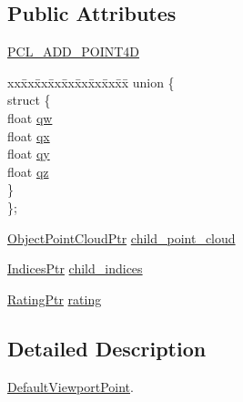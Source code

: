 \subsection*{\-Public \-Attributes}
\begin{DoxyCompactItemize}
\item 
\hyperlink{structnext__best__view_1_1DefaultViewportPoint_a04945c245ebdd7ef5a9f6aa2320d2bcb}{\-P\-C\-L\-\_\-\-A\-D\-D\-\_\-\-P\-O\-I\-N\-T4\-D}
\item 
\begin{tabbing}
xx\=xx\=xx\=xx\=xx\=xx\=xx\=xx\=xx\=\kill
union \{\\
\>struct \{\\
\>\>float \hyperlink{structnext__best__view_1_1DefaultViewportPoint_af7bf215f49b2d0cf2bbbeb95ddc6b101}{qw}\\
\>\>float \hyperlink{structnext__best__view_1_1DefaultViewportPoint_a9c2d21a9ea378fafa7c75a254b52999d}{qx}\\
\>\>float \hyperlink{structnext__best__view_1_1DefaultViewportPoint_aa68cbfe3d11d77f1beb7f43cf22b86eb}{qy}\\
\>\>float \hyperlink{structnext__best__view_1_1DefaultViewportPoint_ae5cdbdef5b635e1042b32d0bf9eb6a95}{qz}\\
\>\} \\
\}; \\

\end{tabbing}\item 
\hyperlink{namespacenext__best__view_af8b3b448f67ab117bb7c59bc7c34f0b3}{\-Object\-Point\-Cloud\-Ptr} \hyperlink{structnext__best__view_1_1DefaultViewportPoint_a9b10c2483854148bececa5f46fe9d911}{child\-\_\-point\-\_\-cloud}
\item 
\hyperlink{namespacenext__best__view_a89edd5f370254b5c7689adfede9fe6a7}{\-Indices\-Ptr} \hyperlink{structnext__best__view_1_1DefaultViewportPoint_a7c4e7ffb72ba9d936c8614178b3852cb}{child\-\_\-indices}
\item 
\hyperlink{namespacenext__best__view_a24cf26ec1dec2cc4c167e32798d1abeb}{\-Rating\-Ptr} \hyperlink{structnext__best__view_1_1DefaultViewportPoint_a5cae4fbc0960ef7e835c51c01801d25b}{rating}
\end{DoxyCompactItemize}


\subsection{\-Detailed \-Description}
\hyperlink{structnext__best__view_1_1DefaultViewportPoint}{\-Default\-Viewport\-Point}. 

